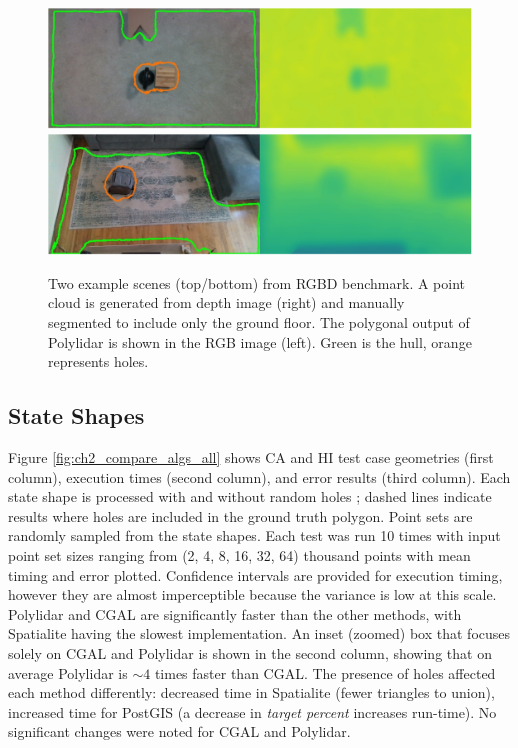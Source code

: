 \begin{figure}[ht] 
    \centering
      \includegraphics[width=0.80\linewidth]{chapter_2_polylidar/imgs/RealSensePictures-scene_08_stack.pdf}
      \includegraphics[width=0.80\linewidth]{chapter_2_polylidar/imgs/RealSensePictures-scene_11_stack.pdf}
  \caption[Extracting a polygon from a plane-segmented RGBD point cloud]{Two example scenes (top/bottom) from RGBD benchmark. A point cloud is generated from depth image (right) and manually segmented to include only the ground floor. The polygonal output of Polylidar is shown in the RGB image (left). Green is the hull, orange represents holes. }
  \label{fig:ch2_realsense_benchmark} 
\end{figure}

\subsection{State Shapes}\label{sec:ch2_state_shapes}

Figure \ref{fig:ch2_compare_algs_all} shows CA and HI test case geometries (first column), execution times (second column), and error results (third column). Each state shape is processed with and without random holes
; dashed lines indicate results where holes are included in the ground truth polygon. Point sets are randomly sampled from the state shapes. Each test was run 10 times with input point set sizes ranging from (2, 4, 8, 16, 32, 64) thousand points with mean timing and error plotted. Confidence intervals are provided for execution timing, however they are almost imperceptible because the variance is low at this scale. Polylidar and CGAL are significantly faster than the other methods, with Spatialite having the slowest implementation. An inset (zoomed) box that focuses solely on CGAL and Polylidar is shown in the second column, showing that on average Polylidar is $\sim4$ times faster than CGAL. 
The presence of holes affected each method differently: decreased time in Spatialite (fewer triangles to union), increased time for PostGIS (a decrease in \emph{target percent} increases run-time). No significant changes were noted for CGAL and Polylidar.  

